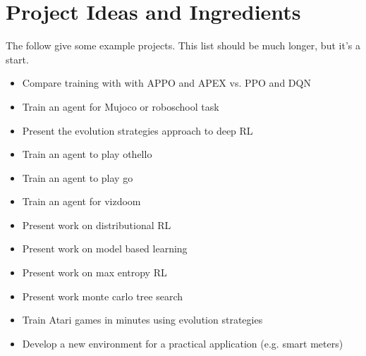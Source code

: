 \documentclass{article}
\begin{document}
\section{Project Ideas and Ingredients} \label{sec:proj-ideas}
The follow give some example projects. This list should be much longer, but it's a start.
\begin{itemize}
\item Compare training with with APPO and APEX vs. PPO and DQN
\item Train an agent for Mujoco or roboschool task
\item Present the evolution strategies approach to deep RL
\item Train an agent to play othello
\item Train an agent to play go
\item Train an agent for vizdoom
\item Present work on distributional RL
\item Present work on model based learning
\item Present work on max entropy RL
\item Present work monte carlo tree search
\item Train Atari games in minutes using evolution strategies
\item Develop a new environment for a practical application (e.g. smart meters)
\end{itemize}
\end{document}
